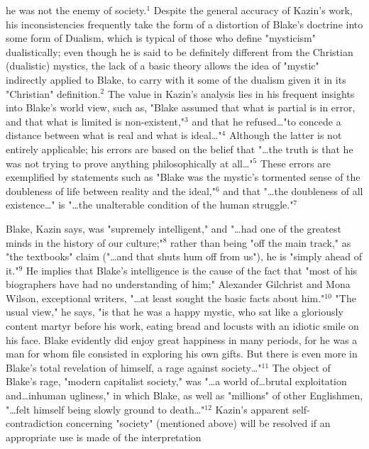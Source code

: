 \noindent he was not the enemy of society.$^{1}$ Despite the general accuracy of Kazin's work, his inconsistencies frequently take the form of a
distortion of Blake's doctrine into some form of Dualism, which is typical of those who define "mysticism" dualistically;
even though he is said to be definitely different from the Christian (dualistic) mystics, the lack of a basic theory
allows the idea of "mystic" indirectly applied to Blake, to carry with it some of the dualism given it in its "Christian"
definition.$^{2}$ The value in Kazin's analysis lies in his frequent insights into Blake's world view, such as, "Blake
assumed that what is partial is in error, and that what is limited is non-existent,"$^{3}$ and that he refused\dots"to concede a
distance between what is real and what is ideal\dots"$^{4}$ Although the latter is not entirely applicable; his errors are based
on the belief that "\dots the truth is that he was not trying to prove anything philosophically at all\dots"$^{5}$ These errors
are exemplified by statements such as "Blake was the mystic's tormented sense of the doubleness of life between reality and the ideal,"$^{6}$ and
that "\dots the doubleness of all existence\dots" is "\dots the unalterable condition of the human struggle."$^{7}$\par
\vspace*{0.5\baselineskip}
Blake, Kazin says, was "supremely intelligent," and "\dots had one of the greatest minds in the history of our culture;"$^{8}$
rather than being "off the main track," as "the textbooks" claim ("\dots and that shuts hum off from us"), he is "simply
ahead of it."$^{9}$ He implies that Blake's intelligence is the cause of the fact that "most of his biographers have had no
understanding of him;" Alexander Gilchrist and Mona Wilson, exceptional writers, "\dots at least sought the basic facts about him."$^{10}$ "The usual view," he says,
"is that he was a happy mystic, who sat like a gloriously content martyr before his work, eating bread and locusts with an idiotic smile
on his face. Blake evidently did enjoy great happiness in many periods, for he was a man for whom file consisted in exploring his own
gifts. But there is even more in Blake's total revelation of himself, a rage against society\dots"$^{11}$ The object of Blake's rage, "modern capitalist
society," was "\dots a world of\dots brutal exploitation and\dots inhuman ugliness," in which Blake, as well
as "millions" of other Englishmen, "\dots felt himself being slowly ground to death\dots"$^{12}$ Kazin's apparent self-contradiction concerning
"society" (mentioned above) will be resolved if an appropriate use is made of the interpretation
